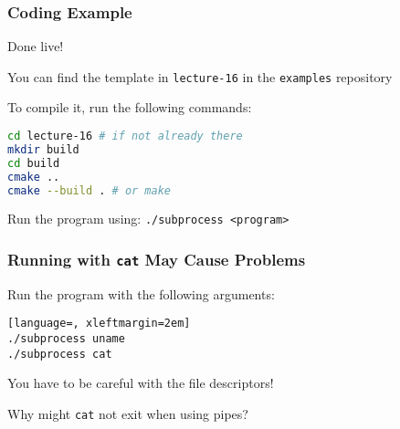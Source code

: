   \begin{frame}[fragile]
    \frametitle{Coding Example}

    Done live!

    \vspace{2em}

    You can find the template in \texttt{lecture-16} in the \texttt{examples}
    repository

    \vspace{2em}

    To compile it, run the following commands:

    \begin{lstlisting}[language=bash, xleftmargin=2em]
cd lecture-16 # if not already there
mkdir build
cd build
cmake ..
cmake --build . # or make
    \end{lstlisting}

    \vspace{2em}

    Run the program using: \lstinline!./subprocess <program>!
  \end{frame}

  \begin{frame}[fragile]
    \frametitle{Running with \texttt{cat} May Cause Problems}

    Run the program with the following arguments:

    \vspace{2em}

    \begin{lstlisting}[language=, xleftmargin=2em]
./subprocess uname
./subprocess cat
    \end{lstlisting}

    \vspace{2em}

    You have to be careful with the file descriptors!

    \vspace{2em}

    Why might \texttt{cat} not exit when using pipes?
  \end{frame}


